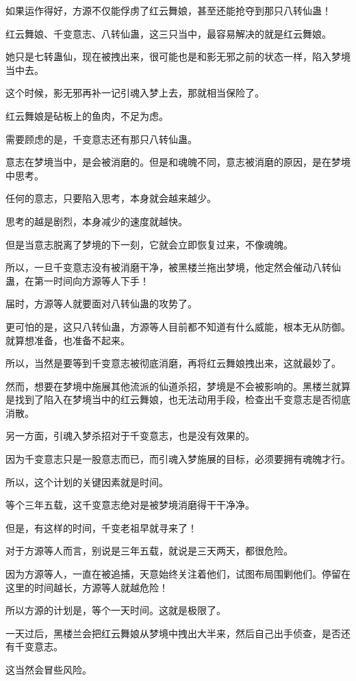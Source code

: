 \begin{this_body}
如果运作得好，方源不仅能俘虏了红云舞娘，甚至还能抢夺到那只八转仙蛊！

红云舞娘、千变意志、八转仙蛊，这三只当中，最容易解决的就是红云舞娘。

她只是七转蛊仙，现在被拽出来，很可能也是和影无邪之前的状态一样，陷入梦境当中去。

这个时候，影无邪再补一记引魂入梦上去，那就相当保险了。

红云舞娘是砧板上的鱼肉，不足为虑。

需要顾虑的是，千变意志还有那只八转仙蛊。

意志在梦境当中，是会被消磨的。但是和魂魄不同，意志被消磨的原因，是在梦境中思考。

任何的意志，只要陷入思考，本身就会越来越少。

思考的越是剧烈，本身减少的速度就越快。

但是当意志脱离了梦境的下一刻，它就会立即恢复过来，不像魂魄。

所以，一旦千变意志没有被消磨干净，被黑楼兰拖出梦境，他定然会催动八转仙蛊，在第一时间向方源等人下手！

届时，方源等人就要面对八转仙蛊的攻势了。

更可怕的是，这只八转仙蛊，方源等人目前都不知道有什么威能，根本无从防御。就算想准备，也准备不起来。

所以，当然是要等到千变意志被彻底消磨，再将红云舞娘拽出来，这就最妙了。

然而，想要在梦境中施展其他流派的仙道杀招，梦境是不会被影响的。黑楼兰就算是找到了陷入在梦境当中的红云舞娘，也无法动用手段，检查出千变意志是否彻底消散。

另一方面，引魂入梦杀招对于千变意志，也是没有效果的。

因为千变意志只是一股意志而已，而引魂入梦施展的目标，必须要拥有魂魄才行。

所以，这个计划的关键因素就是时间。

等个三年五载，这千变意志绝对是被梦境消磨得干干净净。

但是，有这样的时间，千变老祖早就寻来了！

对于方源等人而言，别说是三年五载，就说是三天两天，都很危险。

因为方源等人，一直在被追捕，天意始终关注着他们，试图布局围剿他们。停留在这里的时间越长，方源等人就越危险！

所以方源的计划是，等个一天时间。这就是极限了。

一天过后，黑楼兰会把红云舞娘从梦境中拽出大半来，然后自己出手侦查，是否还有千变意志。

这当然会冒些风险。


\end{this_body}
